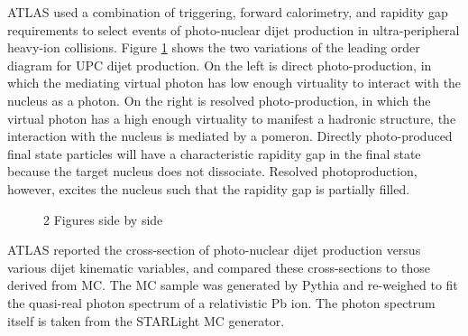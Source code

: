 ATLAS used a combination of triggering, forward calorimetry, and rapidity gap requirements to select events of photo-nuclear dijet production in ultra-peripheral heavy-ion collisions. Figure \ref{fig:exampleDijetAtlas} shows the two variations of the leading order diagram for UPC dijet production. On the left is direct photo-production, in which the mediating virtual photon has low enough virtuality to interact with the nucleus as a photon. On the right is resolved photo-production, in which the virtual photon has a high enough virtuality to manifest a hadronic structure, the interaction with the nucleus is mediated by a pomeron. Directly photo-produced final state particles will have a characteristic rapidity gap in the final state because the target nucleus does not dissociate. Resolved photoproduction, however, excites the nucleus such that the rapidity gap is partially filled. 
\begin{figure}%
    \centering
    \qquad
    \caption{2 Figures side by side}%
    \label{fig:exampleDijetAtlas}%
\end{figure}

ATLAS reported the cross-section of photo-nuclear dijet production versus various dijet kinematic variables, and compared these cross-sections to those derived from MC. The MC sample was generated by Pythia and re-weighed to fit the quasi-real photon spectrum of a relativistic Pb ion. The photon spectrum itself is taken from the STARLight MC generator.

